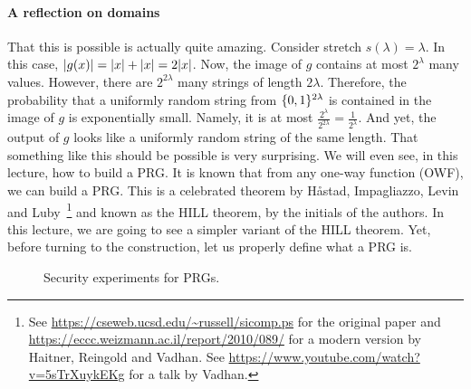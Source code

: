 \documentclass[a4paper,table,dvipsnames]{article}
\theoremstyle{definition}
\begin{document}
\paragraph{A reflection on domains}
That this is possible is actually quite amazing. Consider stretch $s(\lambda)=\lambda$. In this case, $\abs{g(x)}=\abs{x}+\abs{x}=2\abs{x}$.
Now, the image of $g$ contains at most $2^\lambda$ many values. However, there are $2^{2\lambda}$ many strings of length $2\lambda$. Therefore, the probability that a uniformly random string from $\{0,1\}^{2\lambda}$ is contained in the image of $g$ is exponentially small. Namely, it is at most $\frac{2^{\lambda}}{2^{2\lambda}}=\frac{1}{2^{\lambda}}$. And yet, the output of $g$ looks like a uniformly random string of the same length. That something like this should be possible is very surprising. We will even see, in this lecture, how to
build a PRG. It is known that from any one-way function (OWF), we can build a PRG. This is a celebrated theorem by H{\aa}stad, Impagliazzo, Levin and Luby~\footnote{See \url{https://cseweb.ucsd.edu/~russell/sicomp.ps} for the original paper and \url{https://eccc.weizmann.ac.il/report/2010/089/} for a modern version by Haitner, Reingold and Vadhan. See \url{https://www.youtube.com/watch?v=5sTrXuykEKg} for a talk by Vadhan.} and known as the HILL theorem, by the initials of the authors. In this lecture, we are going to see a simpler variant of the HILL theorem. Yet, before turning to the construction, let us properly define what a PRG is.

\begin{wrapfigure}{R}{0.42\textwidth}
\vspace{-0.7cm}
\begin{center}
  \begin{pchstack}
  \pchspace
  \end{pchstack}\end{center}
\vspace{-0.85cm}
\caption{Security experiments for PRGs.}
\label{fig:prg}
\vspace{-0.25cm}
\end{wrapfigure}
\end{document}
